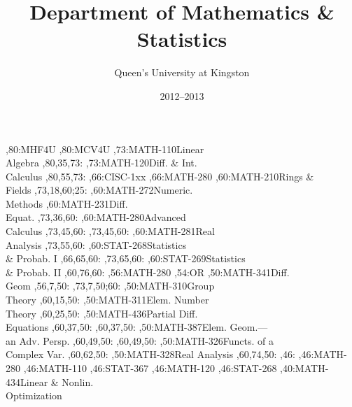 \documentclass[9pt]{extarticle}
\begin{document}
\title{Department of Mathematics \& Statistics}
\author{Queen's University at Kingston}
\date{2012--2013}
\maketitle
\thispagestyle{empty}
\begin{chart}
,80:{MHF4U}
,80:{MCV4U}
,73:{MATH-110}{Linear\\Algebra}{}
  ,80,35,73:
,73:{MATH-120}{Diff. \& Int.\\Calculus}{}
  ,80,55,73:
,66:{CISC-1xx}
,66:{MATH-280}
,60:{MATH-210}{Rings \&\\Fields}{}
  ,73,18,60;25:
,60:{MATH-272}{Numeric.\\Methods}{}
,60:{MATH-231}{Diff.\\Equat.}{}
  ,73,36,60:
,60:{MATH-280}{Advanced\\Calculus}{}
  ,73,45,60:
  ,73,45,60:
,60:{MATH-281}{Real\\Analysis}{}
  ,73,55,60:
,60:{STAT-268}{Statistics\\\& Probab. I}{}
  ,66,65,60:
  ,73,65,60:
,60:{STAT-269}{Statistics\\\& Probab. II}{}
  ,60,76,60:
,56:{MATH-280}
,54:{OR}
,50:{MATH-341}{Diff.\\Geom}{}
  ,56,7,50:
  ,73,7,50;60:
,50:{MATH-310}{Group\\Theory}{}
  ,60,15,50:
,50:{MATH-311}{Elem. Number\\Theory}{}
  ,60,25,50:
,50:{MATH-436}{Partial Diff.\\Equations}{}
  ,60,37,50:
  ,60,37,50:
,50:{MATH-387}{Elem. Geom.---\\an Adv. Persp.}{}
  ,60,49,50:
  ,60,49,50:
,50:{MATH-326}{Functs. of a\\Complex Var.}{}
  ,60,62,50:
,50:{MATH-328}{Real Analysis}{}
  ,60,74,50:
,46:{}
,46:{MATH-280}
,46:{MATH-110}
,46:{STAT-367}
,46:{MATH-120}
,46:{STAT-268}
,40:{MATH-434}{Linear \& Nonlin.\\Optimization}{}

\end{chart}
\end{document}
